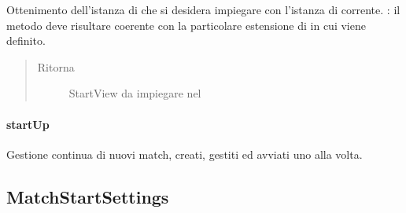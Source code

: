 \documentclass[letterpaper,10pt,italian,openany,oneside]{sphinxmanual}
\begin{document}
\begin{fulllineitems}
\label{\detokenize{source/it/unicam/cs/pa/mastermind/gamecore/MainManager:it.unicam.cs.pa.mastermind.gamecore.MainManager.getStartViewInstance()}}
Ottenimento dell’istanza di  che si desidera impiegare con l’istanza di  corrente. : il metodo deve risultare coerente con la particolare estensione di  in cui viene definito.
\begin{quote}\begin{description}
\item[{Ritorna}] \leavevmode
StartView da impiegare nel 

\end{description}\end{quote}

\end{fulllineitems}



\paragraph{startUp}
\label{\detokenize{source/it/unicam/cs/pa/mastermind/gamecore/MainManager:startup}}

\begin{fulllineitems}
\label{\detokenize{source/it/unicam/cs/pa/mastermind/gamecore/MainManager:it.unicam.cs.pa.mastermind.gamecore.MainManager.startUp()}}
Gestione continua di nuovi match, creati, gestiti ed avviati uno alla volta.

\end{fulllineitems}



\subsection{MatchStartSettings}
\label{\detokenize{source/it/unicam/cs/pa/mastermind/gamecore/MatchStartSettings:matchstartsettings}}\label{\detokenize{source/it/unicam/cs/pa/mastermind/gamecore/MatchStartSettings::doc}}
\end{document}
